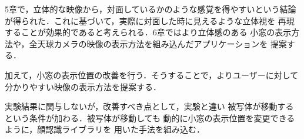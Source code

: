 \begin{comment}
・また，SUSのネガティブな評価項目がOEB使用時で有意差は見られないものも，5に近くなってしまっている．

・OEB使用時のアンケート結果でGUIに関する意見が多く出ている．

・特に「仕様が分かりづらい」，「小窓の表示位置を変えたい」という趣旨の意見が多くみられた．

・小窓の位置のみならず，本来の全天球カメラの映像に被さって小窓が表示される仕様など，映像が複雑になってしまう状況もあり，
それが混乱を招いた可能性がある．

・また，全天球カメラ自体の視野の広さから，パノラマ映像では顔が小さく表示されやすく，PCの画面に表示する
全天周カメラの映像表示方法にも改善の余地がある．

・算出した偽陽性率に改善が見られなかった点から，小窓に表示する顔の表示方法自体も変更する余地がある．

・実験結果に関係しない事項としては，実験用アプリでは被験者の位置が変更しない制限があったが，
実際は被写体は自由に動くことが出来るべきである．被写体が移動しても正しく小窓を表示できるように
する必要がある．
\end{comment}
5章で，立体的な映像から，対面しているかのような感覚を得やすいという結論
が得られた．これに基づいて，実際に対面した時に見えるような立体視を
再現することが効果的であると考えられる．6章ではより立体感のある
小窓の表示方法や，全天球カメラの映像の表示方法を組み込んだアプリケーションを
提案する．

加えて，小窓の表示位置の改善を行う．そうすることで，よりユーザーに対して
分かりやすい映像の表示方法を提案する．

実験結果に関与しないが，改善すべき点として，実験と違い
被写体が移動するという条件が加わる．被写体が移動しても
動的に小窓の表示位置を変更できるように，顔認識ライブラリを
用いた手法を組み込む．
